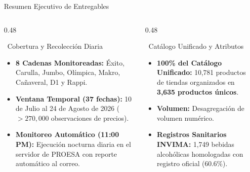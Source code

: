 \documentclass[aspectratio=169, 10pt]{beamer}
\providecommand{\faLayerGroup}{\faDatabase}
\begin{document}
\begin{frame}{Resumen Ejecutivo de Entregables}
    \begin{columns}[T]
        \begin{column}{0.48\textwidth}
            \begin{block}{\faCheckCircle\ Cobertura y Recolección Diaria}
                \footnotesize
                \begin{itemize}
                    \setlength{\itemsep}{4pt}
                    \item \textbf{8 Cadenas Monitoreadas:} Éxito, Carulla, Jumbo, Olímpica, Makro, Cañaveral, D1 y Rappi.
                    \item \textbf{Ventana Temporal (37 fechas):} 10 de Julio al 24 de Agosto de 2026 ($>270,000$ observaciones de precios).
                    \item \textbf{Monitoreo Automático (11:00 PM):} Ejecución nocturna diaria en el servidor de PROESA con reporte automático al correo.
                \end{itemize}
            \end{block}
        \end{column}

        \begin{column}{0.48\textwidth}
            \begin{block}{\faLayerGroup\ Catálogo Unificado y Atributos}
                \footnotesize
                \begin{itemize}
                    \setlength{\itemsep}{4pt}
                    \item \textbf{100\% del Catálogo Unificado:} 10,781 productos de tiendas organizados en \textbf{3,635 productos únicos}.
                    \item \textbf{Volumen:} Desagregación de volumen numérico.
                    \item \textbf{Registros Sanitarios INVIMA:} 1,749 bebidas alcohólicas homologadas con registro oficial (60.6\%).
                \end{itemize}
            \end{block}
        \end{column}
    \end{columns}
\end{frame}
\end{document}
